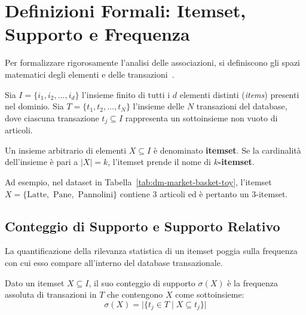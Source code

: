 \FloatBarrier
\section{Definizioni Formali: Itemset, Supporto e Frequenza}
\label{sec:dm-formal-definitions}

Per formalizzare rigorosamente l'analisi delle associazioni, si definiscono gli spazi matematici degli elementi e delle transazioni~\cite{tan2018, agrawal1994}.

\begin{definition}
Sia $I = \{i_1, i_2, \dots, i_d\}$ l'insieme finito di tutti i $d$ elementi distinti (\textit{items}) presenti nel dominio. Sia $T = \{t_1, t_2, \dots, t_N\}$ l'insieme delle $N$ transazioni del database, dove ciascuna transazione $t_j \subseteq I$ rappresenta un sottoinsieme non vuoto di articoli.
\end{definition}

\begin{definition}[$k$-Itemset]
Un insieme arbitrario di elementi $X \subseteq I$ è denominato \textbf{itemset}. Se la cardinalità dell'insieme è pari a $|X| = k$, l'itemset prende il nome di \textbf{$k$-itemset}.
\end{definition}

Ad esempio, nel dataset in Tabella~\ref{tab:dm-market-basket-toy}, l'itemset $X = \{\text{Latte},$ $\text{Pane},$ $\text{Pannolini}\}$ contiene 3 articoli ed è pertanto un $3$-itemset.

\FloatBarrier
\subsection{Conteggio di Supporto e Supporto Relativo}
La quantificazione della rilevanza statistica di un itemset poggia sulla frequenza con cui esso compare all'interno del database transazionale.

\begin{definition}
Dato un itemset $X \subseteq I$, il suo conteggio di supporto $\sigma(X)$ è la frequenza assoluta di transazioni in $T$ che contengono $X$ come sottoinsieme:
\begin{equation}
\label{eq:dm-support-count}
\sigma(X) = \big| \{ t_j \in T \mid X \subseteq t_j \} \big|
\end{equation}
\end{definition}

